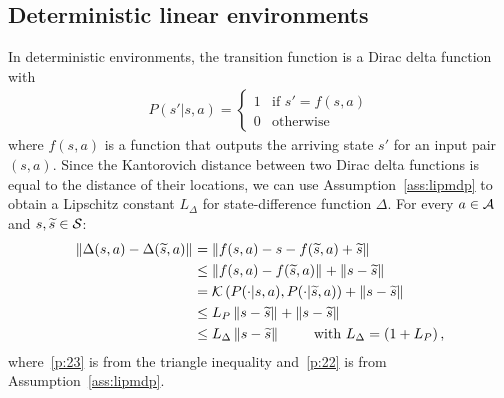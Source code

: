 \subsection{Deterministic linear environments}\label{app:b1}
In deterministic environments, the transition function is a Dirac delta function with 
\begin{align}
P(s'|s,a)= 
\begin{cases}
1 & \text{if } s'=f(s,a)\\
0 & \text{otherwise}
\end{cases}
\end{align}
where $f(s,a)$ is a function that outputs the arriving state $s'$ for an input pair $(s,a)$.
Since the Kantorovich distance between two Dirac delta functions is equal to the distance of their locations, we can use Assumption~\ref{ass:lipmdp} to obtain a Lipschitz constant $L_{\Delta}$ for state-difference function $\Delta$. For every $a\in\mathcal{A}$ and $s,\widetilde{s}\in\mathcal{S}$:
\begin{align}
\left\|\Delta(s,a)-\Delta(\widetilde{s},a)\right\|_{} &=
\left\|f(s,a) - s - f(\widetilde{s},a) + \widetilde{s}\right\|_{} \nonumber\\
&\leq \left\|f(s,a)-f(\widetilde{s},a)\right\|_{} + \left\|s-\widetilde{s}\right\|_{} \label{p:23}\\
&= \mathcal{K}\left(P(\cdot|s,a), P(\cdot| \widetilde{s},a)\right) + \left\|s-\widetilde{s}\right\|_{} \nonumber\\
&\leq L_{P}\left\|s-\widetilde{s}\right\|_{} + \left\|s-\widetilde{s}\right\|_{} \label{p:22}\\
&\leq L_{\Delta} \left\|s-\widetilde{s}\right\|_{} \qquad \text{ with } L_{\Delta} = \left(1 + L_{P}\right), \label{p:18}
\end{align}
where~\eqref{p:23} is from the triangle inequality and~\eqref{p:22} is from Assumption~\ref{ass:lipmdp}.

